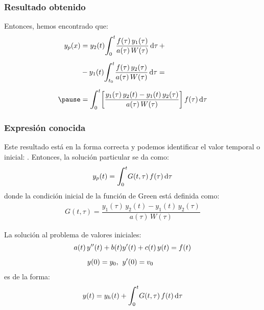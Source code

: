 \documentclass[12pt]{beamer}
\begin{document}
\begin{frame}
\frametitle{Resultado obtenido}
Entonces, hemos encontrado que:
\pause
\begin{eqnarray}
\begin{aligned}[b]
y_{p} (x) &= y_{2} (t) \scaleint{6ex}_{\bs 0}^{t} \dfrac{f (\tau) \, y_{1} (\tau)}{a (\tau) \, W (\tau)} \dd{\tau} + \\[0.5em]
&- y_{1} (t) \scaleint{6ex}_{\bs t_{0}}^{t} \dfrac{f (\tau) \, y_{2} (\tau)}{a (\tau) \, W (\tau)} \dd{\tau} = \\[0.5em] \pause
&= \scaleint{6ex}_{\bs 0}^{t} \bigg[ \dfrac{y_{1} (\tau) \, y_{2} (t) - y_{1} (t) \, y_{2} (\tau)}{a (\tau) \, W (\tau)} \bigg] \, f (\tau) \dd{\tau}
\end{aligned}
\label{eq:ecuacion_07_19}
\end{eqnarray}
\end{frame}

\begin{frame}
\frametitle{Expresión conocida}
Este resultado está en la forma correcta y podemos identificar el valor temporal o inicial: . \pause Entonces, la solución particular se da como:
\pause
\begin{align}
y_{p} (t) = \scaleint{6ex}_{\bs 0}^{t} G (t, \tau) \, f (\tau) \dd{\tau}
\label{eq:ecuacion_07_20}
\end{align}
\pause
donde la condición inicial de la función de Green está definida como:
\begin{align*}
G (t, \tau) = \dfrac{y_{1} (\tau) \, y_{2} (t) - y_{1} (t) \, y_{2} (\tau)}{a (\tau) \, W (\tau)}
\end{align*}
\end{frame}

\begin{frame}[plain]
\begin{tcolorbox}[title={\centering Solución para problema de valores iniciales con la función de Green}]
La solución al problema de valores iniciales:
\begin{align*}
a (t) \, {y}^{\prime \prime} (t) + b (t) &{y}^{\prime} (t) + c (t) \, y (t) = f (t) \\[0.5em]
y (0) = y_{0}, \hspace{0.2cm} &{y}^{\prime} (0) = v_{0}
\end{align*}
\pause
es de la forma:
\begin{align}
y (t) = y_{h} (t) + \scaleint{6ex}_{\bs 0}^{t} G (t, \tau) \, f (t) \dd{\tau}
\label{eq:ecuacion_07_21}
\end{align}
\end{tcolorbox}
\end{frame}
\end{document}
